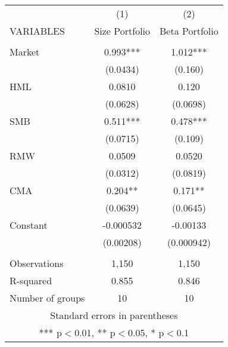 \begin{tabular}{lcc} \hline
 & (1) & (2) \\
VARIABLES & Size Portfolio & Beta Portfolio \\ \hline
 &  &  \\
Market & 0.993*** & 1.012*** \\
 & (0.0434) & (0.160) \\
HML & 0.0810 & 0.120 \\
 & (0.0628) & (0.0698) \\
SMB & 0.511*** & 0.478*** \\
 & (0.0715) & (0.109) \\
RMW & 0.0509 & 0.0520 \\
 & (0.0312) & (0.0819) \\
CMA & 0.204** & 0.171** \\
 & (0.0639) & (0.0645) \\
Constant & -0.000532 & -0.00133 \\
 & (0.00208) & (0.000942) \\
 &  &  \\
Observations & 1,150 & 1,150 \\
R-squared & 0.855 & 0.846 \\
 Number of groups & 10 & 10 \\ \hline
\multicolumn{3}{c}{ Standard errors in parentheses} \\
\multicolumn{3}{c}{ *** p$<$0.01, ** p$<$0.05, * p$<$0.1} \\
\end{tabular}
